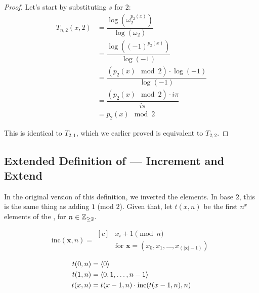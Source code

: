 \documentclass[conference]{IEEEtran}
\begin{document}
\begin{proof}
    Let's start by substituting $s$ for $2$:
    \begin{equation}
    \begin{aligned}
        T_{n,2}(x, 2) &= \dfrac{\log\left(\omega_2^{p_2(x)}\right)}{\log(\omega_2)} \\
                      &= \dfrac{\log\left((-1)^{p_2(x)}\right)}{\log(-1)} \\
                      &= \dfrac{(p_2(x) \mod{2}) \cdot \log(-1)}{\log(-1)} \\
                      &= \dfrac{(p_2(x) \mod{2}) \cdot i\pi}{i\pi} \\
                      &= p_2(x) \mod{2}
    \end{aligned}
    \end{equation}

    This is identical to $T_{2,1}$, which we earlier proved is equivalent to $T_{2,2}$.
\end{proof}

\subsection{Extended Definition  of \TotalExtensions\xspace --- Increment and Extend}


In the original version of this definition, we inverted the elements. In base $2$, this is the same thing as adding $1$ (mod $2$). Given that, let $t(x, n)$ be the first $n^x$ elements of the \ETMS, for $n \in \mathbb{Z}_{\ge 2}$.

\begin{equation}
    \text{inc}(\mathbf{x}, n) = \begin{aligned}[c]
            &x_i + 1 \pmod{n} \\
            &\text{for } \mathbf{x} = (x_0, x_1, \ldots, x_{(|\mathbf{x}|-1)})
    \end{aligned}
\end{equation}

\begin{equation}
    \begin{aligned}
t(0, n) &= \langle 0 \rangle \\
t(1, n) &= \langle 0, 1, \ldots, n - 1 \rangle \\
t(x, n) &= t(x - 1, n) \cdot \text{inc}(t(x - 1, n), n)
    \end{aligned}
\end{equation}
\end{document}
